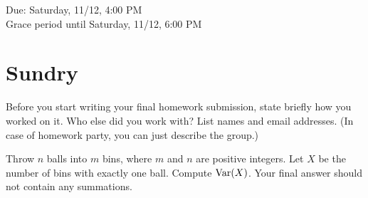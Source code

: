 \documentclass[11pt]{article}
\begin{document}
\maketitle
\fontsize{12}{15}\selectfont


\begin{center}
    Due: Saturday, 11/12, 4:00 PM \\
    Grace period until Saturday, 11/12, 6:00 PM \\
\end{center}

\section*{Sundry}
Before you start writing your final homework submission, state briefly how you worked on it.  Who else did you work with?  List names and email addresses.  (In case of homework party, you can just describe the group.)

{}

\vspace{15pt}


Throw $n$ balls into $m$ bins, where $m$ and $n$ are positive integers. Let $X$ be the number of bins with exactly one ball. Compute $\operatorname{Var} (X)$. Your final answer should not contain any summations.
\end{document}
